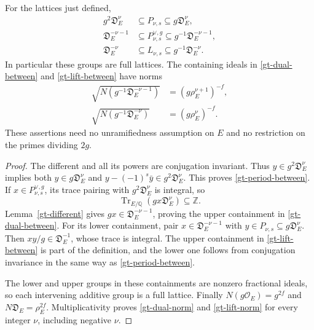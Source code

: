 \begin{proposition}\label{gt-lattice-containments}
For the lattices just defined,
\begin{align}
 g^2\mathfrak D_E^\nu
       &\subseteq P_{\nu,s}\subseteq g\mathfrak D_E^\nu,
             \label{gt-period-between}\\
 \mathfrak D_E^{-\nu-1}
       &\subseteq P_{\nu,s}^{\vee,g}
                  \subseteq g^{-1}\mathfrak D_E^{-\nu-1},
             \label{gt-dual-between}\\
 \mathfrak D_E^{-\nu}
       &\subseteq L_{\nu,s}
                  \subseteq g^{-1}\mathfrak D_E^{-\nu}.
             \label{gt-lift-between}
\end{align}
In particular these groups are full lattices.  The containing ideals
in \eqref{gt-dual-between} and \eqref{gt-lift-between} have norms
\begin{align}
 \sqrt{N(g^{-1}\mathfrak D_E^{-\nu-1})}
       &=(g\rho_E^{\nu+1})^{-f},
             \label{gt-dual-norm}\\
 \sqrt{N(g^{-1}\mathfrak D_E^{-\nu})}
       &=(g\rho_E^\nu)^{-f}.
             \label{gt-lift-norm}
\end{align}
These assertions need no unramifiedness assumption on $E$ and no
restriction on the primes dividing $2g$.
\end{proposition}

\begin{proof}
The different and all its powers are conjugation invariant.  Thus
$y\in g^2\mathfrak D_E^\nu$ implies both
$y\in g\mathfrak D_E^\nu$ and
$y-(-1)^s\bar y\in g^2\mathfrak D_E^\nu$.
This proves \eqref{gt-period-between}.
If $x\in P_{\nu,s}^{\vee,g}$, its trace pairing with
$g^2\mathfrak D_E^\nu$ is integral, so
\[
 \operatorname{Tr}_{E/\mathbb Q}(gx\mathfrak D_E^\nu)
        \subseteq\mathbb Z.
\]
Lemma~\ref{gt-different} gives
$gx\in\mathfrak D_E^{-\nu-1}$, proving the upper containment in
\eqref{gt-dual-between}.  For its lower containment, pair
$x\in\mathfrak D_E^{-\nu-1}$ with
$y\in P_{\nu,s}\subseteq g\mathfrak D_E^\nu$.
Then $xy/g\in\mathfrak D_E^{-1}$, whose trace is integral.
The upper containment in \eqref{gt-lift-between} is part of the
definition, and the lower one follows from conjugation invariance
in the same way as \eqref{gt-period-between}.

The lower and upper groups in these containments are nonzero
fractional ideals, so each intervening additive group is a full
lattice.  Finally $N(g\mathcal O_E)=g^{2f}$ and
$N\mathfrak D_E=\rho_E^{2f}$.  Multiplicativity proves
\eqref{gt-dual-norm} and \eqref{gt-lift-norm} for every integer
$\nu$, including negative $\nu$.
\end{proof}


